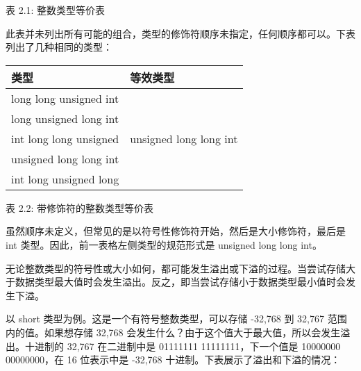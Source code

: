 \begin{center}
表 2.1: 整数类型等价表
\end{center}

此表并未列出所有可能的组合，类型的修饰符顺序未指定，任何顺序都可以。下表列出了几种相同的类型：

\begin{longtable}{|l|l|}
\hline
\textbf{类型}          & \textbf{等效类型}                \\ \hline
\endfirsthead
%
\endhead
%
long long unsigned int & \multirow{5}{*}{unsigned long long int} \\ \cline{1-1}
long unsigned long int &                                         \\ \cline{1-1}
int long long unsigned &                                         \\ \cline{1-1}
unsigned long long int &                                         \\ \cline{1-1}
int long unsigned long &                                         \\ \hline
\end{longtable}

\begin{center}
表 2.2: 带修饰符的整数类型等价表
\end{center}

虽然顺序未定义，但常见的是以符号性修饰符开始，然后是大小修饰符，最后是 int 类型。因此，前一表格左侧类型的规范形式是 unsigned long long int。

无论整数类型的符号性或大小如何，都可能发生溢出或下溢的过程。当尝试存储大于数据类型最大值时会发生溢出。反之，即当尝试存储小于数据类型最小值时会发生下溢。

以 short 类型为例。这是一个有符号整数类型，可以存储 -32,768 到 32,767 范围内的值。如果想存储 32,768 会发生什么？由于这个值大于最大值，所以会发生溢出。十进制的 32,767 在二进制中是 01111111 11111111，下一个值是 10000000 00000000，在 16 位表示中是 -32,768 十进制。下表展示了溢出和下溢的情况：

